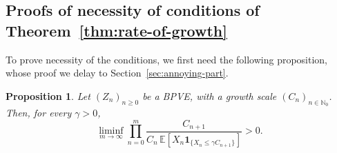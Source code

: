 \documentclass[12pt]{article}
\newtheorem{prop}[thm]{Proposition}
\theoremstyle{definition}
\begin{document}
 \subsection{Proofs of necessity of conditions of Theorem~\ref{thm:rate-of-growth}}
To prove necessity of the conditions, we first need the following proposition, whose proof we delay to Section~\ref{sec:annoying-part}. 
\begin{prop} \label{prop:annoying-part}
Let $(Z_n)_{n\geq 0}$ be a BPVE, with a growth scale $(C_{n})_{n \in \mathbb{N}_0}$. Then, for every $\gamma>0$, 
\begin{equation} \label{eq:most-annoying-part}
\liminf_{m \to \infty}
\prod_{n=0}^{m}
\frac{C_{n+1}}
{C_n\,
\mathbb E\left[
X_n\mathbf 1_{\{X_n\leq \gamma C_{n+1}\}}
\right]}
>0.
\end{equation}
\end{prop}
\end{document}
